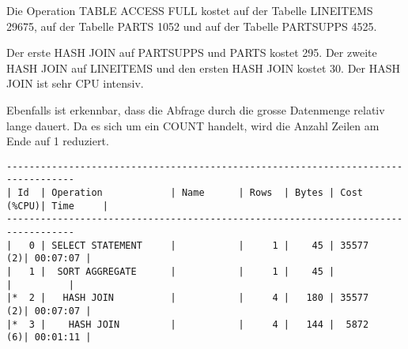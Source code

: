 \documentclass[11pt,a4paper,parskip=half]{scrartcl}
\begin{document}
Die Operation TABLE ACCESS FULL kostet auf der Tabelle LINEITEMS 29675, auf der Tabelle PARTS 1052 und auf der Tabelle PARTSUPPS 4525.

Der erste HASH JOIN auf PARTSUPPS und PARTS kostet 295. Der zweite HASH JOIN auf LINEITEMS und den ersten HASH JOIN kostet 30. Der HASH JOIN ist sehr CPU intensiv.

Ebenfalls ist erkennbar, dass die Abfrage durch die grosse Datenmenge relativ lange dauert. Da es sich um ein COUNT handelt, wird die Anzahl Zeilen am Ende auf 1 reduziert.
\begin{lstlisting}
----------------------------------------------------------------------------------                                                                                                                                                                                                                           
| Id  | Operation            | Name      | Rows  | Bytes | Cost (%CPU)| Time     |                                                                                                                                                                                                                           
----------------------------------------------------------------------------------                                                                                                                                                                                                                           
|   0 | SELECT STATEMENT     |           |     1 |    45 | 35577   (2)| 00:07:07 |                                                                                                                                                                                                                           
|   1 |  SORT AGGREGATE      |           |     1 |    45 |            |          |                                                                                                                                                                                                                           
|*  2 |   HASH JOIN          |           |     4 |   180 | 35577   (2)| 00:07:07 |                                                                                                                                                                                                                           
|*  3 |    HASH JOIN         |           |     4 |   144 |  5872   (6)| 00:01:11 |                                                                                                                                                                                                                           

\end{lstlisting}
\end{document}
